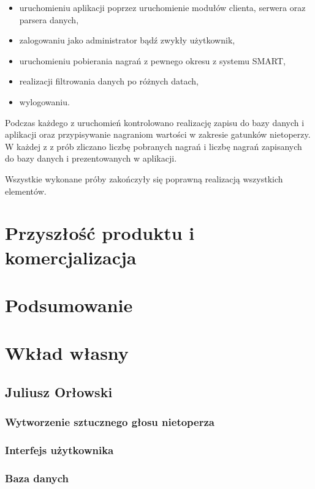 \documentclass{sprz}
\begin{document}
\begin{itemize}
  \item uruchomieniu aplikacji poprzez uruchomienie modułów clienta, serwera oraz parsera danych,
  \item zalogowaniu jako administrator bądź zwykły użytkownik,
  \item uruchomieniu pobierania nagrań z pewnego okresu z systemu SMART,
  \item realizacji filtrowania danych po różnych datach,
  \item wylogowaniu.
\end{itemize}

Podczas każdego z uruchomień kontrolowano realizację zapisu do bazy danych i aplikacji oraz przypisywanie nagraniom wartości w zakresie gatunków nietoperzy.
W każdej z z prób zliczano liczbę pobranych nagrań i liczbę nagrań zapisanych do bazy danych i prezentowanych w aplikacji.


Wszystkie wykonane próby zakończyły się poprawną realizacją wszystkich elementów.

\chapter{Przyszłość produktu i komercjalizacja}

\chapter{Podsumowanie}

\chapter{Wkład własny}

\section{Juliusz Orłowski}

\subsection{Wytworzenie sztucznego głosu nietoperza}

\subsection{Interfejs użytkownika}

\subsection{Baza danych}
\end{document}
